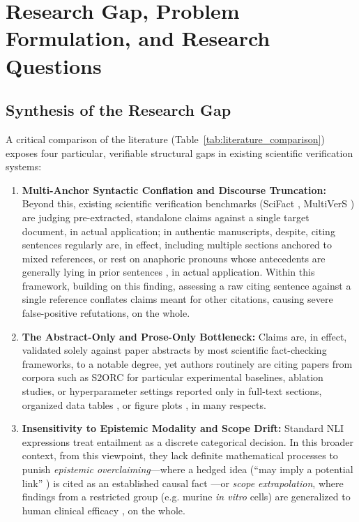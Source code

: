 \documentclass[sigconf]{acmart}
\begin{document}
\section{Research Gap, Problem Formulation, and Research Questions}
\label{sec:gap_problem}

\subsection{Synthesis of the Research Gap}
A critical comparison of the literature (Table~\ref{tab:literature_comparison}) exposes four particular, verifiable structural gaps in existing scientific verification systems:
\begin{enumerate}
\item \textbf{Multi-Anchor Syntactic Conflation and Discourse Truncation:} Beyond this, existing scientific verification benchmarks (SciFact \cite{wadden2020fact}, MultiVerS \cite{wadden2022multivers}) are judging pre-extracted, standalone claims against a single target document, in actual application; in authentic manuscripts, despite, citing sentences regularly are, in effect, including multiple sections anchored to mixed references, or rest on anaphoric pronouns whose antecedents are generally lying in prior sentences \cite{jurgens2018measuring,kamoi2023wice}, in actual application. Within this framework, building on this finding, assessing a raw citing sentence against a single reference conflates claims meant for other citations, causing severe false-positive refutations, on the whole.
\item \textbf{The Abstract-Only and Prose-Only Bottleneck:} Claims are, in effect, validated solely against paper abstracts \cite{wadden2020fact,jin2019pubmedqa} by most scientific fact-checking frameworks, to a notable degree, yet authors routinely are citing papers from corpora such as S2ORC \cite{lo2020s2orc} for particular experimental baselines, ablation studies, or hyperparameter settings reported only in full-text sections, organized data tables \cite{herzig2020tapas,lu2023scitab}, or figure plots \cite{akhtar2023reading}, in many respects.
\item \textbf{Insensitivity to Epistemic Modality and Scope Drift:} Standard NLI expressions \cite{williams2018broad,thorne2018fever} treat entailment as a discrete categorical decision. In this broader context, from this viewpoint, they lack definite mathematical processes to punish \emph{epistemic overclaiming}---where a hedged idea (``may imply a potential link'' \cite{hyland1998hedging}) is cited as an established causal fact \cite{greenberg2009citation}---or \emph{scope extrapolation}, where findings from a restricted group (e.g. murine \emph{in vitro} cells) are generalized to human clinical efficacy \cite{begley2012raise,mogull2017accuracy}, on the whole.

\end{enumerate}
\end{document}
